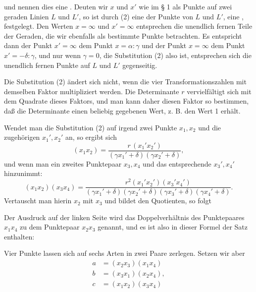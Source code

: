 und nennen dies eine . Deuten wir $x$ und $x'$ wie im § 1 als Punkte auf zwei geraden Linien $L$ und $L'$, so ist durch (2) eine  der Punkte von $L$ und $L'$, eine , festgelegt. Den Werten $x=\infty$ und $x'=\infty$ entsprechen die unendlich fernen Teile der Geraden, die wir ebenfalls als bestimmte Punkte betrachten. Es entspricht dann der Punkt $x'=\infty$ dem Punkt $x=\alpha:\gamma$ und der Punkt $x=\infty$ dem Punkt $x'=-\delta:\gamma$, und nur wenn $\gamma=0$, die Substitution (2) also  ist, entsprechen sich die unendlich fernen Punkte auf $L$ und $L'$ gegenseitig.

Die Substitution (2) ändert sich nicht, wenn die vier Transformationszahlen mit demselben Faktor multipliziert werden. Die Determinante $r$ vervielfältigt sich mit dem Quadrate dieses Faktors, und man kann daher diesen Faktor so bestimmen, daß die Determinante einen beliebig gegebenen Wert, z. B. den Wert 1 erhält.

Wendet man die Substitution (2) auf irgend zwei Punkte $x_1, x_2$ und die zugehörigen $x_1', x_2'$ an, so ergibt sich
\[
(x_1x_2) = \frac{r\,(x_1'x_2')}{(\gamma x_1'+\delta)(\gamma x_2'+\delta)},
\]
und wenn man ein zweites Punktepaar $x_3, x_4$ und das entsprechende $x_3', x_4'$ hinzunimmt:
\[
(x_1x_2)(x_3x_4) = \frac{r^2(x_1'x_2')(x_3'x_4')}{(\gamma x_1'+\delta)(\gamma x_2'+\delta)(\gamma x_3'+\delta)(\gamma x_4'+\delta)}.
\]
Vertauscht man hierin $x_2$ mit $x_3$ und bildet den Quotienten, so folgt

Der Ausdruck auf der linken Seite wird das Doppelverhältnis des Punktepaares $x_1x_4$ zu dem Punktepaar $x_2x_3$ genannt, und es ist also in dieser Formel der Satz enthalten:


Vier Punkte lassen sich auf sechs Arten in zwei Paare zerlegen. Setzen wir aber
\begin{align*}
a &= (x_2x_3)(x_1x_4) \\
b &= (x_3x_1)(x_2x_4), \\
c &= (x_1x_2)(x_3x_4)
\end{align*}

